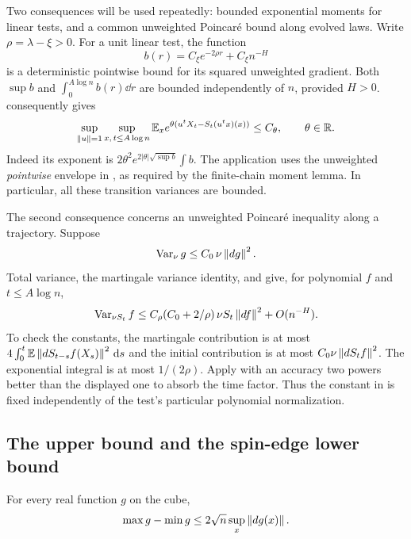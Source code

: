 Two consequences will be used repeatedly: bounded exponential moments
for linear tests, and a common unweighted Poincar\'e bound along evolved
laws.  Write $\rho=\lambda-\xi>0$.  For a unit linear test, the function
\[
 b(r)=C_\xi e^{-2\rho r}+C_\xi n^{-H}
\]
is a deterministic pointwise bound for its squared unweighted
gradient.  Both $\sup b$ and $\int_0^{A\log n}b(r)\dd r$ are bounded
independently of $n$, provided $H>0$.   consequently gives
\begin{equation}
 \sup_{\left\lVert u\right\rVert=1}\sup_{x,\,t\le A\log n}
 \mathbb E_x e^{\theta(u^tX_t-S_t(u^tx)(x))}\le C_\theta,
 \qquad \theta\in\mathbb R.
 \label{eq:cutoff-linear-mgf}
\end{equation}
Indeed its exponent is
$2\theta^2e^{2|\theta|\sqrt{\sup b}}\int b$.
The application uses the unweighted \emph{pointwise} envelope in
, as required by the finite-chain moment
lemma.  In particular, all these transition variances are bounded.

The second consequence concerns an unweighted Poincar\'e inequality
along a trajectory.  Suppose
\[
 \operatorname{Var}_\nu g\le C_0\,\nu\left\lVert dg\right\rVert^2.
\]
Total variance, the martingale variance identity, and
 give, for polynomial $f$ and
$t\le A\log n$,
\begin{equation}
 \operatorname{Var}_{\nu S_t}f
 \le C_\rho(C_0+2/\rho)\,\nu S_t\left\lVert df\right\rVert^2+O(n^{-H}).
 \label{eq:cutoff-trajectory-poincare}
\end{equation}
To check the constants, the martingale contribution is at most
$4\int_0^t\mathbb E\left\lVert dS_{t-s}f(X_s)\right\rVert^2\,\mathrm d s$ and the initial
contribution is at most $C_0\nu\left\lVert dS_tf\right\rVert^2$.
The exponential integral is at most $1/(2\rho)$.
Apply  with an accuracy two powers better
than the displayed one to absorb the time factor.  Thus the constant
in  is fixed independently of the
test's particular polynomial normalization.

\subsection{The upper bound and the spin-edge lower bound}

\begin{lemma}
\label{lem:cutoff-oscillation}
For every real function $g$ on the cube,
\begin{equation}
 \max g-\min g\le2\sqrt n\sup_x\left\lVert dg(x)\right\rVert.
 \label{eq:cutoff-oscillation}
\end{equation}
\end{lemma}


